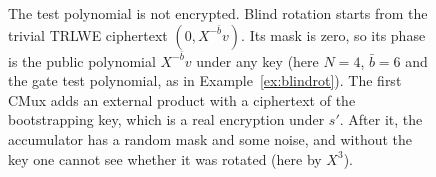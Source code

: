 \begin{figure}[!htb]
\centering

\caption{The test polynomial is not encrypted. Blind rotation starts from the
trivial TRLWE ciphertext $(0,X^{-\bar b}v)$. Its mask is zero, so its phase is
the public polynomial $X^{-\bar b}v$ under any key (here $N=4$, $\bar b=6$ and
the gate test polynomial, as in Example~\ref{ex:blindrot}). The first CMux adds
an external product with a ciphertext of the bootstrapping key, which is a
real encryption under $s'$. After it, the accumulator has a random mask and
some noise, and without the key one cannot see whether it was rotated (here by
$X^{3}$).}
\label{fig:trivial}
\end{figure}
